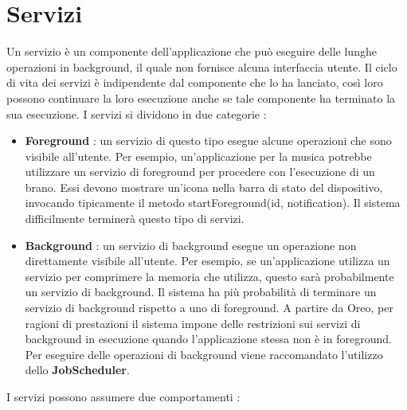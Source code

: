 \documentclass[12pt]{report}
\begin{document}
\section{Servizi}
Un servizio è un componente dell'applicazione che può eseguire delle lunghe operazioni in background, il quale non fornisce alcuna interfaccia utente. Il ciclo di vita dei servizi è indipendente dal componente che lo ha lanciato, così loro possono continuare la loro esecuzione anche se tale componente ha terminato la sua esecuzione. I servizi si dividono in due categorie :
\begin{itemize}
\item \textbf{Foreground} : un servizio di questo tipo esegue alcune operazioni che sono visibile all'utente. Per esempio, un'applicazione per la musica potrebbe utilizzare un servizio di foreground per procedere con l'esecuzione di un brano. Essi devono mostrare un'icona nella barra di stato del dispositivo, invocando tipicamente il metodo startForeground(id, notification). Il sistema difficilmente terminerà questo tipo di servizi.
\item \textbf{Background} : un servizio di background esegue un operazione non direttamente visibile all'utente. Per esempio, se un'applicazione utilizza un servizio per comprimere la memoria che utilizza, questo sarà probabilmente un servizio di background. Il sistema ha più probabilità di terminare un servizio di background rispetto a uno di foreground. A partire da Oreo, per ragioni di prestazioni il sistema impone delle restrizioni sui servizi di background in esecuzione quando l'applicazione stessa non è in foreground. Per eseguire delle operazioni di background viene raccomandato l'utilizzo dello \textbf{JobScheduler}.
\end{itemize}
I servizi possono assumere due comportamenti :
\end{document}
